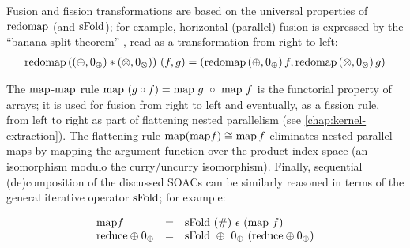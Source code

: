 Fusion and fission transformations are based on the universal
properties of $\mathrm{redomap}$ (and $\mathrm{sFold}$); for example, horizontal
(parallel) fusion is expressed by the ``banana split theorem''
\cite{mfp91}, read as a transformation from right to left:
\[
   \begin{array}{l}
  \mathrm{redomap}\, ((\oplus, 0_{\oplus}) * (\otimes, 0_{\otimes})) ~ (f, g) =(\mathrm{redomap}\, (\oplus, 0_{\oplus})\, f, \mathrm{redomap}\, (\otimes,
     0_{\otimes})\, g )
   \end{array}
\]

The $\mathrm{map}$-$\mathrm{map}$ rule
$\mathrm{map} ~ (g \circ f) = \mathrm{map} ~ g ~ \circ ~ \mathrm{map} ~ f$ is the
functorial property of arrays; it is used for fusion from right to
left and eventually, as a fission rule, from left to right as part of
flattening nested parallelism (see \cref{chap:kernel-extraction}).
%
The flattening rule $ \mathrm{map} (\mathrm{map} f) \cong \mathrm{map} \,f$ eliminates
nested parallel maps by mapping the argument function over the product
index space (an isomorphism modulo the curry/uncurry isomorphism).
Finally, sequential (de)composition of the discussed SOACs can be
similarly reasoned in terms of the general iterative operator
$\mathrm{sFold}$; for example:

\[
\begin{array}{lcl}
\mathrm{map} f & = & \mathrm{sFold}~(\#)~\epsilon~(\mathrm{map}~f) \\
\mathrm{reduce} \oplus 0_{\oplus} & = & \mathrm{sFold}~\oplus~0_{\oplus}~(\mathrm{reduce} \oplus 0_{\oplus}) \\
\end{array}
\]



